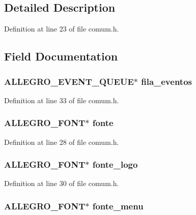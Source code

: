 \subsection{Detailed Description}


Definition at line 23 of file comum.\-h.



\subsection{Field Documentation}
\hypertarget{struct_game_a1d4a163479efecd3c6aea8236b72ef13}{
\subsubsection[{fila\-\_\-eventos}]{\setlength{\rightskip}{0pt plus 5cm}A\-L\-L\-E\-G\-R\-O\-\_\-\-E\-V\-E\-N\-T\-\_\-\-Q\-U\-E\-U\-E$\ast$ fila\-\_\-eventos}}\label{struct_game_a1d4a163479efecd3c6aea8236b72ef13}


Definition at line 33 of file comum.\-h.

\hypertarget{struct_game_aca3355f860197722c1d4c2ad26601dfd}{
\subsubsection[{fonte}]{\setlength{\rightskip}{0pt plus 5cm}A\-L\-L\-E\-G\-R\-O\-\_\-\-F\-O\-N\-T$\ast$ fonte}}\label{struct_game_aca3355f860197722c1d4c2ad26601dfd}


Definition at line 28 of file comum.\-h.

\hypertarget{struct_game_a9d57b510f157087d12e1c47586d2cfce}{
\subsubsection[{fonte\-\_\-logo}]{\setlength{\rightskip}{0pt plus 5cm}A\-L\-L\-E\-G\-R\-O\-\_\-\-F\-O\-N\-T$\ast$ fonte\-\_\-logo}}\label{struct_game_a9d57b510f157087d12e1c47586d2cfce}


Definition at line 30 of file comum.\-h.

\hypertarget{struct_game_af6bd9fcd9fb4f2cfba0ce6b10d9536fc}{
\subsubsection[{fonte\-\_\-menu}]{\setlength{\rightskip}{0pt plus 5cm}A\-L\-L\-E\-G\-R\-O\-\_\-\-F\-O\-N\-T$\ast$ fonte\-\_\-menu}}\label{struct_game_af6bd9fcd9fb4f2cfba0ce6b10d9536fc}


